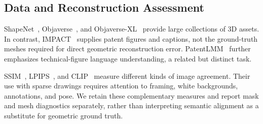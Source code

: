 \subsection{Data and Reconstruction Assessment}
ShapeNet~\cite{chang2015shapenet}, Objaverse~\cite{deitke2023objaverse}, and
Objaverse-XL~\cite{deitke2023objaversexl} provide large collections of 3D assets.
In contrast, IMPACT~\cite{shomee2024impact} supplies patent figures and captions,
not the ground-truth meshes required for direct geometric reconstruction error.
PatentLMM~\cite{shukla2025patentlmm} further emphasizes technical-figure language
understanding, a related but distinct task.

SSIM~\cite{wang2004ssim}, LPIPS~\cite{zhang2018lpips}, and
CLIP~\cite{radford2021clip} measure different kinds of image agreement. Their
use with sparse drawings requires attention to framing, white backgrounds,
annotations, and pose. We retain these complementary measures and report mask
and mesh diagnostics separately, rather than interpreting semantic alignment as
a substitute for geometric ground truth.
